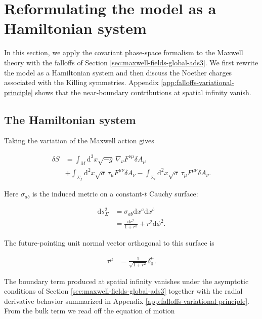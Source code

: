 \section{Reformulating the model as a Hamiltonian system}\label{sec:hamiltonian-and-symmetries}

In this section, we apply the covariant phase-space formalism to the Maxwell theory with the falloffs of Section \ref{sec:maxwell-fields-global-ads3}. We first rewrite the model as a Hamiltonian system and then discuss the Noether charges associated with the Killing symmetries. Appendix \ref{app:falloffs-variational-principle} shows that the near-boundary contributions at spatial infinity vanish.

\subsection{The Hamiltonian system}\label{subsec:hamiltonian-system}

Taking the variation of the Maxwell action gives

\begin{align}
\delta S & =\int _{M}\mathrm{d}^{3}x\sqrt{ -g }\,\nabla_{\nu}F^{\nu \mu}\delta A_{\mu} \\
 & +\int _{\Sigma _{f}}\mathrm{d}^{2}x\sqrt{ \sigma }\,\tau _{\mu}F^{\mu \nu}\delta A_{\nu}-\int _{\Sigma _{i}}\mathrm{d}^{2}x\sqrt{ \sigma }\,\tau _{\mu}F^{\mu \nu}\delta A_{\nu}.
\end{align}

Here $\sigma_{ab}$ is the induced metric on a constant-$t$ Cauchy surface:

\begin{align}
\mathrm{d}s^{2}_{\Sigma} & =\sigma _{ab}\mathrm{d}x^{a}\mathrm{d}x^{b} \\
&=\frac{\mathrm{d}r^{2}}{1+r^{2}}+r^{2}\mathrm{d}\phi ^{2}.
\end{align}

The future-pointing unit normal vector orthogonal to this surface is

\begin{align}
\tau ^{\mu}&=\frac{1}{\sqrt{ 1+r^{2} }}\delta _{0}^{\mu}.
\end{align}

The boundary term produced at spatial infinity vanishes under the asymptotic conditions of Section \ref{sec:maxwell-fields-global-ads3} together with the radial derivative behavior summarized in Appendix \ref{app:falloffs-variational-principle}. From the bulk term we read off the equation of motion

